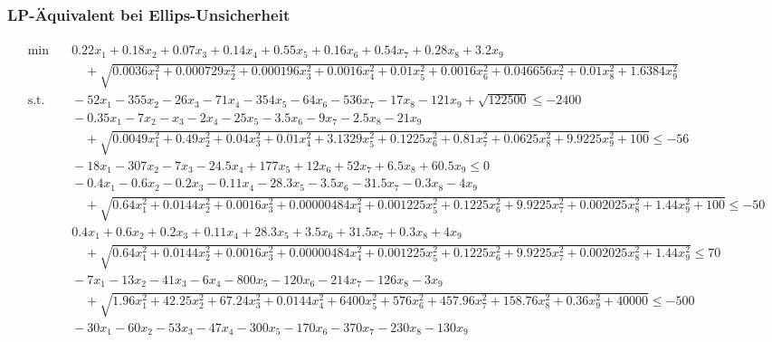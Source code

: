 \documentclass[a4paper,12pt]{article}
\begin{document}
\newpage

\subsubsection*{LP-\"Aquivalent bei Ellips-Unsicherheit}
\label{sec:lp-equivalent-ellips}
\begin{adjustwidth}{-1.5cm}{}
\begin{tiny}
\setlength{\jot}{0pt}
\[
\begin{aligned}
   \begin{aligned}
    \min & \quad  0.22x_1 + 0.18x_2 + 0.07x_3 + 0.14x_4 + 0.55x_5 + 0.16x_6 + 0.54x_7 + 0.28x_8 + 3.2x_9 \\
    & \qquad+ \sqrt{0.0036x_1^2+0.000729x_2^2+0.000196x_3^2+0.0016x_4^2+0.01x_5^2+0.0016x_6^2+0.046656x_7^2+0.01x_8^2+1.6384x_9^2} \\
    \text{s.t.}
    & \quad -52x_1-355x_2-26x_3-71x_4-354x_5-64x_6-536x_7-17x_8-121x_9+\sqrt{122500} \leq -2400 \\
    & \quad -0.35x_1 - 7x_2 - x_3 - 2x_4 - 25x_5 - 3.5x_6 - 9x_7 - 2.5x_8 - 21x_9 \\
    & \qquad + \sqrt{0.0049x_1^2 + 0.49x_2^2 + 0.04x_3^2 + 0.01x_4^2 + 3.1329x_5^2 + 0.1225x_6^2 + 0.81x_7^2 + 0.0625x_8^2 + 9.9225x_9^2 + 100} \leq -56 \\
    & \quad -18x_1 - 307x_2 - 7x_3 - 24.5x_4 + 177x_5 + 12x_6 + 52x_7 + 6.5x_8 + 60.5x_9 \leq 0 \\
    & \quad -0.4x_1 - 0.6x_2 - 0.2x_3 - 0.11x_4 - 28.3x_5 - 3.5x_6 - 31.5x_7 - 0.3x_8 - 4x_9 \\
    & \qquad + \sqrt{0.64x_1^2+ 0.0144x_2^2 + 0.0016x_3^2 + 0.00000484x_4^2 + 0.001225x_5^2 + 0.1225x_6^2 + 9.9225x_7^2 + 0.002025x_8^2 + 1.44x_9^2 + 100} \leq -50 \\
    & \quad 0.4x_1 + 0.6x_2 + 0.2x_3 + 0.11x_4 + 28.3x_5 + 3.5x_6 + 31.5x_7 + 0.3x_8 + 4x_9 \\
    & \qquad + \sqrt{0.64x_1^2+ 0.0144x_2^2 + 0.0016x_3^2 + 0.00000484x_4^2 + 0.001225x_5^2 + 0.1225x_6^2 + 9.9225x_7^2 + 0.002025x_8^2 + 1.44x_9^2} \leq 70 \\
    & \quad -7x_1 - 13x_2 - 41x_3 - 6x_4 - 800x_5 - 120x_6 - 214x_7 - 126x_8 - 3x_9 \\
    & \qquad + \sqrt{1.96x_1^2 + 42.25x_2^2 + 67.24x_3^2 + 0.0144x_4^2 + 6400x_5^2 + 576x_6^2 + 457.96x_7^2 + 158.76x_8^2 + 0.36x_9^2 + 40000} \leq -500 \\
    & \quad -30x_1 - 60x_2 - 53x_3 - 47x_4 - 300x_5 -170x_6 - 370x_7 -230x_8 - 130x_9 \\

\end{aligned}
\end{aligned}\]
\end{tiny}
\end{adjustwidth}
\end{document}
